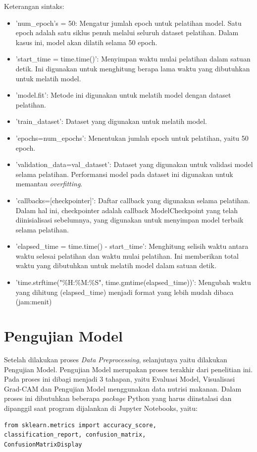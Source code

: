 Keterangan sintaks:
\begin{itemize}
    \item 'num\_epoch's = 50: Mengatur jumlah epoch untuk pelatihan model. Satu epoch adalah satu siklus penuh melalui seluruh dataset pelatihan. Dalam kasus ini, model akan dilatih selama 50 epoch.
    \item 'start\_time = time.time()': Menyimpan waktu mulai pelatihan dalam satuan detik. Ini digunakan untuk menghitung berapa lama waktu yang dibutuhkan untuk melatih model.
    \item 'model.fit': Metode ini digunakan untuk melatih model dengan dataset pelatihan.
    \item 'train\_dataset': Dataset yang digunakan untuk melatih model.
    \item 'epochs=num\_epochs': Menentukan jumlah epoch untuk pelatihan, yaitu 50 epoch.
    \item 'validation\_data=val\_dataset': Dataset yang digunakan untuk validasi model selama pelatihan. Performansi model pada dataset ini digunakan untuk memantau \textit{overfitting}.
    \item 'callbacks=[checkpointer]': Daftar callback yang digunakan selama pelatihan. Dalam hal ini, checkpointer adalah callback ModelCheckpoint yang telah diinisialisasi sebelumnya, yang digunakan untuk menyimpan model terbaik selama pelatihan.
    \item 'elapsed\_time = time.time() - start\_time': Menghitung selisih waktu antara waktu selesai pelatihan dan waktu mulai pelatihan. Ini memberikan total waktu yang dibutuhkan untuk melatih model dalam satuan detik.
    \item 'time.strftime("\%H:\%M:\%S", time.gmtime(elapsed\_time))': Mengubah waktu yang dihitung (elapsed\_time) menjadi format yang lebih mudah dibaca (jam:menit)
\end{itemize}

\section{Pengujian Model}
Setelah dilakukan proses \textit{Data Preprocessing}, selanjutnya yaitu dilakukan Pengujian Model. Pengujian Model merupakan proses terakhir dari penelitian ini. Pada proses ini dibagi menjadi 3 tahapan, yaitu Evaluasi Model, Visualisasi Grad-CAM dan Pengujian Model menggunakan data nutrisi makanan. Dalam proses ini dibutuhkan beberapa \textit{package} Python yang harus diinstalasi dan dipanggil saat program dijalankan di Jupyter Notebooks, yaitu:
\begin{lstlisting}[style=customc]
from sklearn.metrics import accuracy_score,
classification_report, confusion_matrix,
ConfusionMatrixDisplay
\end{lstlisting}

